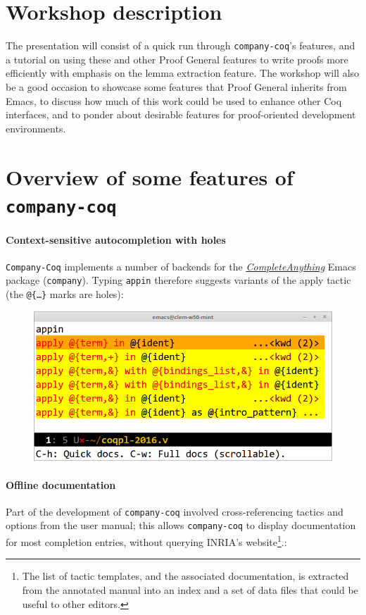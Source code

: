 \documentclass[preprint]{sigplanconf}
\newcommand{\proofg}{Proof General\xspace}
\begin{document}
\section*{Workshop description}

The presentation will consist of a quick run through \texttt{company-coq}'s features, and a tutorial on using these and other \proofg features to write proofs more efficiently with emphasis on the lemma extraction feature. The workshop will also be a good occasion to showcase some features that \proofg inherits from Emacs, to discuss how much of this work could be used to enhance other Coq interfaces, and to ponder about desirable features for proof-oriented development environments.

\section*{Overview of some features of \texttt{company-coq}}

\paragraph{Context-sensitive autocompletion with holes} \texttt{Company-Coq} implements a number of backends for the \href{https://company-mode.github.io/}{\emph{CompleteAnything}} Emacs package (\texttt{company}). Typing \texttt{app{\kern0.5pt}in} therefore suggests variants of the apply tactic (the \texttt{@\{\ldots\}} marks are holes):

\begin{figure}[H]
  \centering
  \includegraphics[width=\linewidth]{apply-in-xxl-2.png}
\end{figure}

\paragraph{Offline documentation} Part of the development of
\texttt{company-coq} involved cross-referencing tactics and options
from the user manual; this allows \texttt{company-coq} to display
documentation for most completion entries, without querying INRIA's
website\footnote{The list of tactic templates, and the associated
  documentation, is extracted from the annotated manual into an index and a set of data files that could be useful to other editors.}.:
\end{document}
